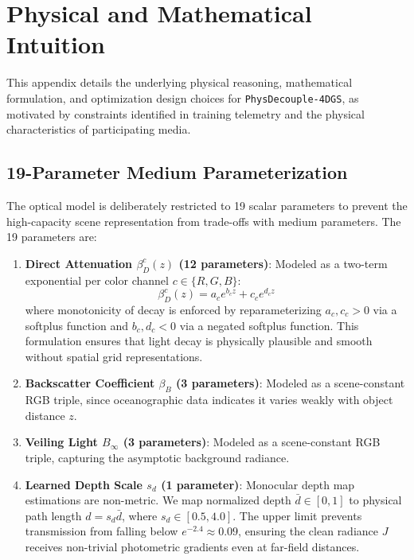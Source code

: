 \documentclass[11pt,a4paper]{article}
\begin{document}
\appendix

\section{Physical and Mathematical Intuition}
\label{sec:appendix_intuition}

This appendix details the underlying physical reasoning, mathematical formulation, and optimization design choices for \texttt{PhysDecouple-4DGS}, as motivated by constraints identified in training telemetry and the physical characteristics of participating media.

\subsection{19-Parameter Medium Parameterization}
The optical model is deliberately restricted to 19 scalar parameters to prevent the high-capacity scene representation from trade-offs with medium parameters. The 19 parameters are:
\begin{enumerate}
    \item \textbf{Direct Attenuation $\beta_D^c(z)$ (12 parameters)}: Modeled as a two-term exponential per color channel $c \in \{R,G,B\}$:
    \begin{equation}
        \beta_D^c(z) = a_c e^{b_c z} + c_c e^{d_c z}
    \end{equation}
    where monotonicity of decay is enforced by reparameterizing $a_c, c_c > 0$ via a softplus function and $b_c, d_c < 0$ via a negated softplus function. This formulation ensures that light decay is physically plausible and smooth without spatial grid representations.
    
    \item \textbf{Backscatter Coefficient $\beta_B$ (3 parameters)}: Modeled as a scene-constant RGB triple, since oceanographic data indicates it varies weakly with object distance $z$.
    
    \item \textbf{Veiling Light $B_{\infty}$ (3 parameters)}: Modeled as a scene-constant RGB triple, capturing the asymptotic background radiance.
    
    \item \textbf{Learned Depth Scale $s_d$ (1 parameter)}: Monocular depth map estimations are non-metric. We map normalized depth $\bar{d} \in [0, 1]$ to physical path length $d = s_d \bar{d}$, where $s_d \in [0.5, 4.0]$. The upper limit prevents transmission from falling below $e^{-2.4} \approx 0.09$, ensuring the clean radiance $J$ receives non-trivial photometric gradients even at far-field distances.
\end{enumerate}
\end{document}
